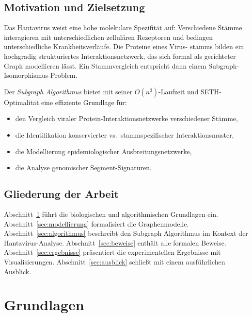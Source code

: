 ﻿\documentclass[a4paper,12pt]{article}
\theoremstyle{definition}
\begin{document}
\subsection{Motivation und Zielsetzung}

Das Hantavirus weist eine hohe molekulare Spezifit\"at auf: Verschiedene
St\"amme interagieren mit unterschiedlichen zellul\"aren Rezeptoren und
bedingen unterschiedliche Krankheitsverl\"aufe. Die Proteine eines Virus-
stamms bilden ein hochgradig strukturiertes Interaktionsnetzwerk, das
sich formal als gerichteter Graph modellieren l\"asst. Ein Stammvergleich
entspricht dann einem Subgraph-Isomorphismus-Problem.

Der \emph{Subgraph Algorithmus} \cite{Epp2026} bietet mit seiner
$O(n^3)$-Laufzeit und SETH-Optimalit\"at eine effiziente Grundlage f\"ur:
\begin{itemize}
    \item den Vergleich viraler Protein-Interaktionsnetzwerke verschiedener St\"amme,
    \item die Identifikation konservierter vs.\ stammspezifischer Interaktionsmuster,
    \item die Modellierung epidemiologischer Ausbreitungsnetzwerke,
    \item die Analyse genomischer Segment-Signaturen.
\end{itemize}

\subsection{Gliederung der Arbeit}

Abschnitt~\ref{sec:grundlagen} f\"uhrt die biologischen und algorithmischen
Grundlagen ein. Abschnitt~\ref{sec:modellierung} formalisiert die Graphenmodelle.
Abschnitt~\ref{sec:algorithmus} beschreibt den Subgraph Algorithmus im Kontext
der Hantavirus-Analyse. Abschnitt~\ref{sec:beweise} enth\"alt alle formalen
Beweise. Abschnitt~\ref{sec:ergebnisse} pr\"asentiert die experimentellen
Ergebnisse mit Visualisierungen. Abschnitt~\ref{sec:ausblick} schlie{\ss}t
mit einem ausf\"uhrlichen Ausblick.

\section{Grundlagen}
\label{sec:grundlagen}
\end{document}
